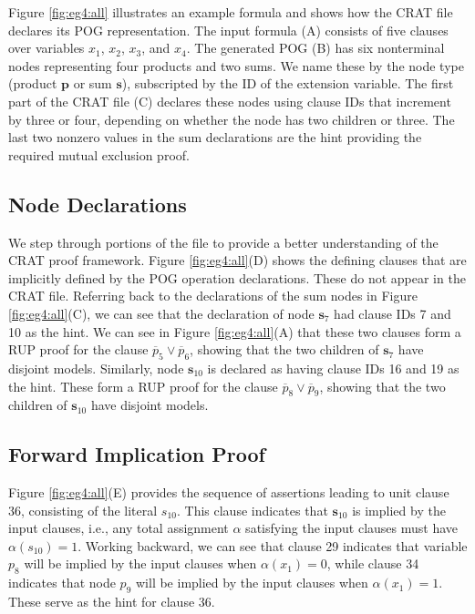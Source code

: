 \documentclass[letterpaper,USenglish,cleveref, autoref, thm-restate]{lipics-v2021}
\newcommand{\obar}[1]{\overline{#1}}
\newcommand{\assign}{\alpha}
\newcommand{\makenode}[1]{\mathbf{#1}}
\newcommand{\nodes}{\makenode{s}}
\newcommand{\nodep}{\makenode{p}}
\begin{document}
Figure \ref{fig:eg4:all} illustrates an example formula and shows how
the CRAT file declares its POG representation.  The input formula (A)
consists of five clauses over variables $x_1$, $x_2$, $x_3$, and
$x_4$.  The generated POG (B) has six nonterminal nodes representing
four products and two sums.  We name these by the node
type (product $\nodep$ or sum $\nodes$), subscripted by the ID of the
extension variable.
  The first part of the CRAT file (C) declares
these nodes using clause IDs that increment by three or four,
depending on whether the node has two children or three.  The last two
nonzero values in the sum declarations are the hint providing the
required mutual exclusion proof.

\subsection{Node Declarations}

We step through portions of the file to provide a better understanding of the CRAT proof framework.
Figure
\ref{fig:eg4:all}(D) shows the defining clauses that are implicitly
defined by the POG operation declarations.  These do not appear in the
CRAT file.  Referring back to the declarations of the sum nodes in
Figure \ref{fig:eg4:all}(C), we can see that the declaration of node
$\nodes_7$ had clause IDs 7 and 10 as the hint.  We can see in Figure
\ref{fig:eg4:all}(A) that these two clauses form a RUP proof for the clause
$\obar{p}_5 \lor \obar{p}_6$, showing that the two children of $\nodes_7$
have disjoint models.  Similarly, node $\nodes_{10}$ is declared as having
clause IDs 16 and 19 as the hint.  These form a RUP proof for the clause
$\obar{p}_8 \lor \obar{p}_9$, showing that the two children of
$\nodes_{10}$ have disjoint models.

\subsection{Forward Implication Proof}

Figure \ref{fig:eg4:all}(E) provides the sequence of assertions
leading to unit clause 36, consisting of the literal $s_{10}$.  This clause indicates that $\nodes_{10}$ is implied by the input clauses, i.e.,
any total assignment $\assign$
satisfying the input clauses must have $\assign(s_{10}) = 1$.
Working backward, we can see that
clause 29 indicates that variable $p_8$ will be implied by the input
clauses when $\assign(x_1) = 0$, while clause 34 indicates that node $p_9$ will
be implied by the input clauses when $\assign(x_1) = 1$.  These serve as the
hint for clause 36.
\end{document}
